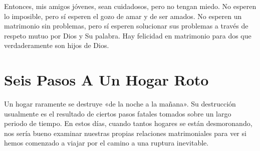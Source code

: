 \documentclass[12pt, twoside, openright]{book}
\begin{document}
Entonces, mis amigos jóvenes, sean cuidadosos, pero no tengan miedo. No esperen lo imposible, pero sí esperen el gozo de amar y de ser amados. No esperen un matrimonio sin problemas, pero sí esperen solucionar sus problemas a través de respeto mutuo por Dios y Su palabra. Hay felicidad en matrimonio para dos que verdaderamente son hijos de Dios.

\section{Seis Pasos A Un Hogar Roto}
Un hogar raramente se destruye «de la noche a la mañana».  Su destrucción usualmente es el resultado de ciertos pasos fatales tomados sobre un largo periodo de tiempo. En estos días, cuando tantos hogares se están desmoronando, nos sería bueno examinar nuestras propias relaciones matrimoniales para ver si hemos comenzado a viajar por el camino a una ruptura inevitable. 
\end{document}

